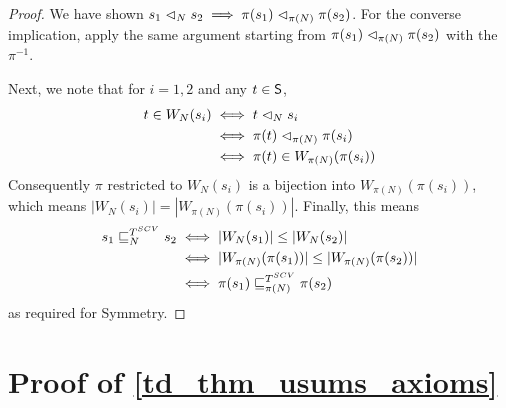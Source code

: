 \begin{proof}
We have shown $s_1 \scoh_N s_2 \implies \pi(s_1) \scoh_{\pi(N)} \pi(s_2)$. For
the converse implication, apply the same argument starting from $\pi(s_1)
\scoh_{\pi(N)} \pi(s_2)$ with the $\pi^{-1}$.

Next, we note that for $i=1, 2$ and any $t \in \S$,
\begin{align*}
    t \in W_N(s_i)
    & \iff t \scoh_N s_i \\
    & \iff \pi(t) \scoh_{\pi(N)} \pi(s_i) \\
    & \iff \pi(t) \in W_{\pi(N)}(\pi(s_i))
\end{align*}
Consequently $\pi$ restricted to $W_N(s_i)$ is a bijection into
$W_{\pi(N)}(\pi(s_i))$, which means $|W_N(s_i)| = |W_{\pi(N)}(\pi(s_i))|$.
Finally, this means
\begin{align*}
    s_1 \sle_N^{T^{SCV}} s_2
    & \iff |W_N(s_1)| \le |W_N(s_2)| \\
    & \iff |W_{\pi(N)}(\pi(s_1))| \le |W_{\pi(N)}(\pi(s_2))| \\
    & \iff \pi(s_1) \sle_{\pi(N)}^{T^{SCV}} \pi(s_2)
\end{align*}
as required for Symmetry.
\end{proof}

\section{Proof of \cref{td_thm_usums_axioms}}

